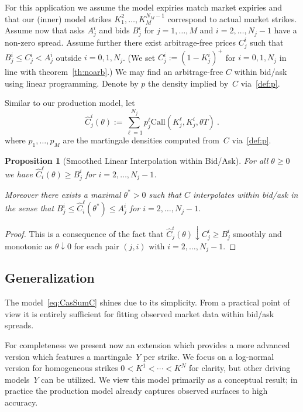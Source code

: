 \documentclass[twoside]{article}
\theoremstyle{plain}
\newtheorem{proposition}[theorem]{Proposition}
\theoremstyle{definition}
\theoremstyle{remark}
\begin{document}
For this application we assume the model expiries match market expiries and that our (inner) model strikes $K^2_1,\ldots,K_M^{N_M-1}$
correspond to actual market strikes. Assume now that asks $A^i_j$ and bids $B^i_j$ for $j=1,\ldots,M$ and $i=2,\ldots,N_j-1$
have a non-zero spread. Assume further there exist arbitrage-free prices $C^i_j$
such that $B^i_j\leq C^i_j<A^i_j$ outside $i=0,1,N_j$. (We set $C^i_j:=(1-K^i_j)^+$ for $i=0,1,N_j$ in line with
theorem~\ref{th:noarb}.) We may find an arbitrage-free $C$ within bid/ask using linear programming.
Denote by $p$ the density implied by~$C$ via~\eqref{def:p}.

Similar to our production model, let
$$
    \hat C_j^i(\theta) := \sum_{\ell=1}^{N_j} p_j^\ell \mathrm{Call}\!\left( K_j^\ell, K^i_j, \theta T \right) \ .
$$
where $p_1,\ldots,p_M$ are the martingale densities computed from~$C$ via~\eqref{def:p}.
\begin{proposition}[Smoothed Linear Interpolation within Bid/Ask]\label{prop:interpol}
For all $\theta\geq 0$ we have $\hat C_i^\ell(\theta)\geq B_j^i$ for $i=2,\ldots,N_j-1$.

Moreover 
there exists a maximal $\theta^*>0$ such that $\hat C$ \emph{interpolates within bid/ask} in the sense that $B_j^i\leq \hat C_i^\ell(\theta^*)\leq A^i_j$
for $i=2,\ldots,N_j-1$.
\end{proposition}
\begin{proof}
This is a consequence of the fact that 
$
\hat C_j^i(\theta) \downarrow C^i_j \geq B^i_j
$
smoothly and monotonic as $\theta\downarrow 0$ for each pair $(j,i)$ with $i=2,\ldots,N_j-1$.
\end{proof}


\subsection{Generalization}\label{sec:genr}

The model~\eqref{eq:CasSumC} shines due to its simplicity. From a practical point
of view it is entirely sufficient for fitting observed market data within bid/ask
spreads.

For completeness we present now an extension which provides a more
advanced version which features a martingale~$Y$ per strike. We focus on 
a log-normal version for homogeneous strikes $0<K^1<\cdots<K^N$ for clarity, but other driving models~$Y$ can be utilized.
We view this model primarily as a conceptual result; in practice the production model already captures observed surfaces to high accuracy.
\end{document}
